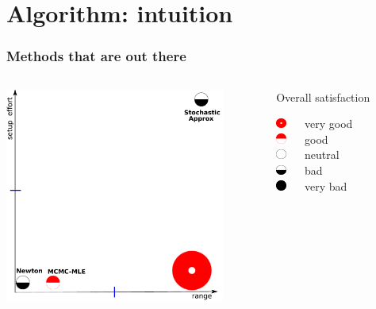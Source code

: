 \documentclass[ 10pt]{beamer}
\begin{document}
\section{Algorithm: intuition}
\frame
{
\frametitle{Methods that are out there}
\begin{columns}[]
\begin{column}[T]{0.6\textwidth}
\includegraphics[height=2.8in]{mck-final-overlay.pdf}
\end{column}
\begin{column}[t]{0.4\textwidth}
{\small
Overall satisfaction

\vspace{1mm}
\includegraphics[height=0.13in]{CR5.pdf} $\quad$ very good\\
\vspace{1mm}
\includegraphics[height=0.13in]{CR4.pdf} $\quad$ good\\
\vspace{1mm}
\includegraphics[height=0.13in]{CR3.pdf} $\quad$ neutral\\
\vspace{1mm}
\includegraphics[height=0.13in]{CR2.pdf} $\quad$ bad\\
\vspace{1mm}
\includegraphics[height=0.13in]{CR1.pdf} $\quad$ very bad\\
\vspace{1mm}
}
\pause


\end{column}
\end{columns}}
\end{document}
